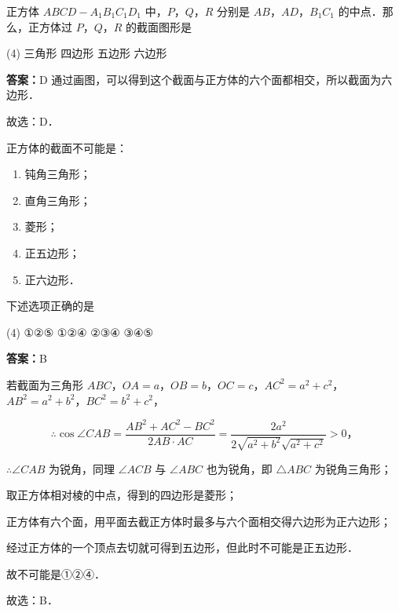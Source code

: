 \begin{example}[\bkstar{3}{5}]
正方体 $ABCD-A_1B_1C_1D_1$ 中，$P$，$Q$，$R$ 分别是 $AB$，$AD$，$B_1C_1$ 的中点．那么，正方体过 $P$，$Q$，$R$ 的截面图形是
\begin{tasks}(4)
    \task 三角形
    \task 四边形
    \task 五边形
    \task 六边形
\end{tasks}
\end{example}
\begin{solution}
\textbf{答案：}D
通过画图，可以得到这个截面与正方体的六个面都相交，所以截面为六边形．

故选：D．
\end{solution}

\vspace{2em}

\begin{example}[\bkstar{3}{5}]
正方体的截面不可能是：
\begin{enumerate}
    \item[①] 钝角三角形；
    \item[②] 直角三角形；
    \item[③] 菱形；
    \item[④] 正五边形；
    \item[⑤] 正六边形．
\end{enumerate}
下述选项正确的是
\begin{tasks}(4)
    \task ①②⑤
    \task ①②④
    \task ②③④
    \task ③④⑤
\end{tasks}
\end{example}
\begin{solution}
\textbf{答案：}B

若截面为三角形 $ABC$，$OA=a$，$OB=b$，$OC=c$，$AC^2=a^2+c^2$，$AB^2=a^2+b^2$，$BC^2=b^2+c^2$，

$$
\therefore \cos\angle CAB=\dfrac{AB^2+AC^2-BC^2}{2AB\cdot AC}=\dfrac{2a^2}{2\sqrt{a^2+b^2}\sqrt{a^2+c^2}}>0，
$$

$\therefore \angle CAB$ 为锐角，同理 $\angle ACB$ 与 $\angle ABC$ 也为锐角，即 $\triangle ABC$ 为锐角三角形；

取正方体相对棱的中点，得到的四边形是菱形；

正方体有六个面，用平面去截正方体时最多与六个面相交得六边形为正六边形；

经过正方体的一个顶点去切就可得到五边形，但此时不可能是正五边形．

故不可能是①②④．

故选：B．
\end{solution}

